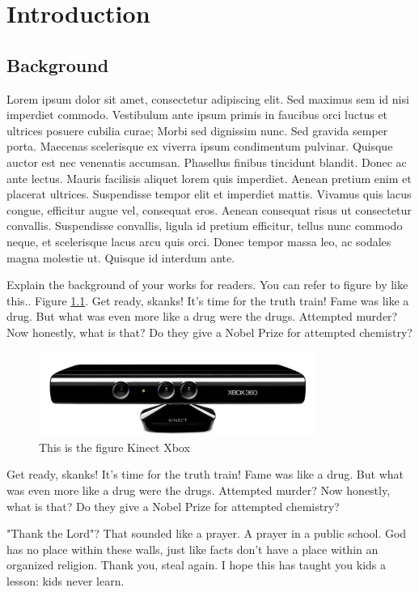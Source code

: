 \documentclass[12pt,oneside,openright,a4paper]{explo-english-project}
\begin{document}
\chapter{Introduction}

\section{Background} 

Lorem ipsum dolor sit amet, consectetur adipiscing elit. Sed maximus sem id nisi imperdiet commodo. Vestibulum ante ipsum primis in faucibus orci luctus et ultrices posuere cubilia curae; Morbi sed dignissim nunc. Sed gravida semper porta. Maecenas scelerisque ex viverra ipsum condimentum pulvinar. Quisque auctor est nec venenatis accumsan. Phasellus finibus tincidunt blandit. Donec ac ante lectus. Mauris facilisis aliquet lorem quis imperdiet. Aenean pretium enim et placerat ultrices. Suspendisse tempor elit et imperdiet mattis. Vivamus quis lacus congue, efficitur augue vel, consequat eros. Aenean consequat risus ut consectetur convallis. Suspendisse convallis, ligula id pretium efficitur, tellus nunc commodo neque, et scelerisque lacus arcu quis orci. Donec tempor massa leo, ac sodales magna molestie ut. Quisque id interdum ante.

Explain the background of your works for readers. You can refer to figure by like this.. Figure \ref{fig:x1}.
Get ready, skanks! It's time for the truth train! Fame was like a drug. But what was even more like a drug were the drugs. Attempted murder? Now honestly, what is that? Do they give a Nobel Prize for attempted chemistry?

\begin{figure}[!h]
\centering
\includegraphics[width=90mm]{X11.jpg}
\caption{This is the figure Kinect Xbox}\label{fig:x1}
\end{figure}

Get ready, skanks! It's time for the truth train! Fame was like a drug. But what was even more like a drug were the drugs. Attempted murder? Now honestly, what is that? Do they give a Nobel Prize for attempted chemistry?

"Thank the Lord"? That sounded like a prayer. A prayer in a public school. God has no place within these walls, just like facts don't have a place within an organized religion. Thank you, steal again. I hope this has taught you kids a lesson: kids never learn.
\end{document}
